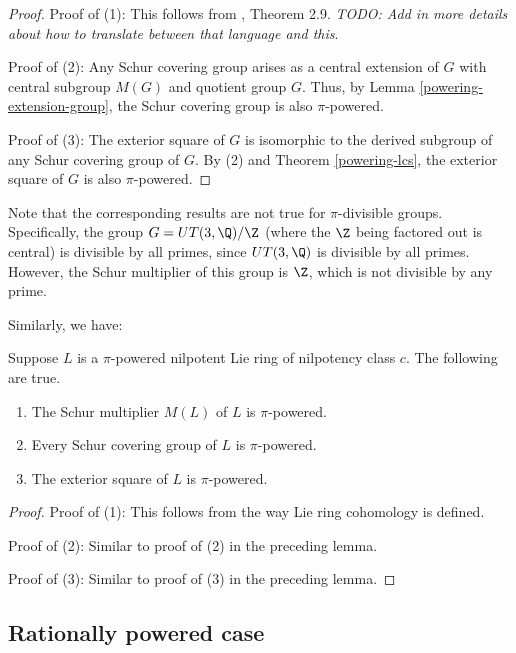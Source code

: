 \begin{proof}
  Proof of (1): This follows from \cite{HiltonMislinRoitberg}, Theorem
  2.9. {\em TODO: Add in more details about how to translate between
    that language and this}.

  Proof of (2): Any Schur covering group arises as a central extension of $G$
  with central subgroup $M(G)$ and quotient group $G$. Thus, by Lemma
  \ref{powering-extension-group}, the Schur covering group is also
  $\pi$-powered.

  Proof of (3): The exterior square of $G$ is isomorphic to the derived
  subgroup of any Schur covering group of $G$. By (2) and Theorem
  \ref{powering-lcs}, the exterior square of $G$ is also
  $\pi$-powered.
\end{proof}

Note that the corresponding results are not true for $\pi$-divisible
groups. Specifically, the group $G = UT(3,\Q)/\Z$ (where the $\Z$
being factored out is central) is divisible by all primes, since
$UT(3,\Q)$ is divisible by all primes. However, the Schur multiplier
of this group is $\Z$, which is not divisible by any prime.

Similarly, we have:

\begin{lemma}\label{schurcoverpipower-lie}
  Suppose $L$ is a $\pi$-powered nilpotent Lie ring of nilpotency
  class $c$. The following are true.

  \begin{enumerate}
  \item The Schur multiplier $M(L)$ of $L$ is $\pi$-powered.
  \item Every Schur covering group of $L$ is $\pi$-powered.
  \item The exterior square of $L$ is $\pi$-powered.
  \end{enumerate} 
\end{lemma}

\begin{proof}
  Proof of (1): This follows from the way Lie ring cohomology is defined.

  Proof of (2): Similar to proof of (2) in the preceding lemma.

  Proof of (3): Similar to proof of (3) in the preceding lemma.
\end{proof}

\subsection{Rationally powered case}

